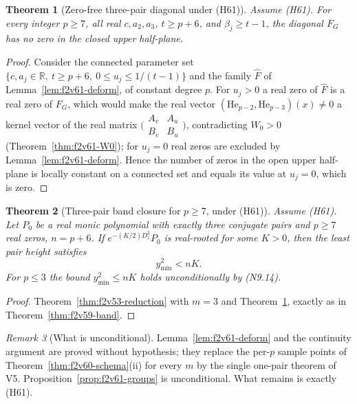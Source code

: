 \documentclass[11pt]{article}
\newtheorem{theorem}{Theorem}[section]
\theoremstyle{definition}
\theoremstyle{remark}
\newtheorem{remark}[theorem]{Remark}
\begin{document}
\begin{theorem}[Zero-free three-pair diagonal under (H61)]
\label{thm:f2v61-zero-free}
Assume (H61).  For every integer \(p\ge7\), all real \(c,a_2,a_3\),
\(t\ge p+6\), and \(\beta_j\ge t-1\), the diagonal \(F_G\) has no zero
in the closed upper half-plane.
\end{theorem}

\begin{proof}
Consider the connected parameter set
\(\{c,a_j\in\mathbb R,\ t\ge p+6,\ 0\le u_j\le1/(t-1)\}\) and the family
\(\widehat F\) of Lemma~\ref{lem:f2v61-deform}, of constant degree
\(p\).  For \(u_j>0\) a real zero of \(\widehat F\) is a real zero of
\(F_G\), which would make the real vector
\((\mathrm{He}_{p-2},\mathrm{He}_{p-3})(x)\ne0\) a kernel vector of the
real matrix \(\bigl(\begin{smallmatrix}A_v&A_u\\B_v&B_u\end{smallmatrix}\bigr)\),
contradicting \(W_0>0\) (Theorem~\ref{thm:f2v61-W0}); for \(u_j=0\)
real zeros are excluded by Lemma~\ref{lem:f2v61-deform}.  Hence the
number of zeros in the open upper half-plane is locally constant on a
connected set and equals its value at \(u_j=0\), which is zero.
\end{proof}

\begin{theorem}[Three-pair band closure for \(p\ge7\), under (H61)]
\label{thm:f2v61-band}
Assume (H61).  Let \(P_0\) be a real monic polynomial with exactly three
conjugate pairs and \(p\ge7\) real zeros, \(n=p+6\).  If
\(e^{-(K/2)D_z^2}P_0\) is real-rooted for some \(K>0\), then the least
pair height satisfies
\begin{equation}
 y_{\min}^2<nK .
 \label{eq:f2v61-bound}
\end{equation}
For \(p\le3\) the bound \(y_{\min}^2\le nK\) holds unconditionally by
\textup{(N9.14)}.
\end{theorem}

\begin{proof}
Theorem~\ref{thm:f2v53-reduction} with \(m=3\) and
Theorem~\ref{thm:f2v61-zero-free}, exactly as in
Theorem~\ref{thm:f2v59-band}.
\end{proof}

\begin{remark}[What is unconditional]
\label{rem:f2v61-unconditional}
Lemma~\ref{lem:f2v61-deform} and the continuity argument are proved
without hypothesis; they replace the per-\(p\) sample points of
Theorem~\ref{thm:f2v60-schema}(ii) for every \(m\) by the single
one-pair theorem of V5.  Proposition~\ref{prop:f2v61-groups} is
unconditional.  What remains is exactly (H61).
\end{remark}
\end{document}
